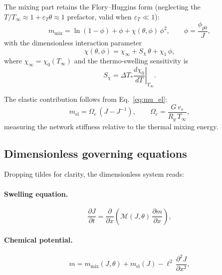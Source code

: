 \documentclass[aps,pre,reprint,superscriptaddress,longbibliography,floatfix]{revtex4-2}
\newcommand{\Ms}{\mathcal{M}}
\newcommand{\pp}{\phi_{p0}}
\begin{document}
The mixing part retains the Flory--Huggins form (neglecting the
$T/T_\infty\approx 1+\varepsilon_T\theta\approx 1$ prefactor, valid
when $\varepsilon_T\ll 1$):
\begin{equation}
  m_\mathrm{mix} = \ln(1-\phi) + \phi + \chi(\theta,\phi)\,\phi^2,
  \qquad \phi = \frac{\pp}{J},
  \label{eq:m_mix}
\end{equation}
with the dimensionless interaction parameter
\begin{equation}
  \chi(\theta,\phi) = \chi_\infty + S_\chi\,\theta + \chi_1\,\phi,
  \label{eq:chi_nondim}
\end{equation}
where $\chi_\infty = \chi_0(T_\infty)$ and the thermo-swelling sensitivity is
\begin{equation}
  S_\chi = \Delta T_*\left.\frac{d\chi_0}{dT}\right|_{T_\infty}.
  \label{eq:Schi}
\end{equation}

The elastic contribution follows from Eq.~\eqref{eq:mu_el}:
\begin{equation}
  m_\mathrm{el} = \Omega_e\,(J - J^{-1}),
  \qquad
  \Omega_e = \frac{G\,v_s}{R_g\,T_\infty},
\end{equation}
measuring the network stiffness relative to the thermal mixing energy.

\subsection{Dimensionless governing equations}

Dropping tildes for clarity, the dimensionless system reads:

\paragraph{Swelling equation.}
\begin{equation}
  \frac{\partial J}{\partial t}
  = \frac{\partial}{\partial x}\!\left(\Ms(J,\theta)\,\frac{\partial m}{\partial x}\right),
  \label{eq:J_nondim}
\end{equation}

\paragraph{Chemical potential.}
\begin{equation}
  m = m_\mathrm{mix}(J,\theta) + m_\mathrm{el}(J) - \ell^2\,\frac{\partial^2 J}{\partial x^2},
  \label{eq:m_nondim_box}
\end{equation}
\end{document}
